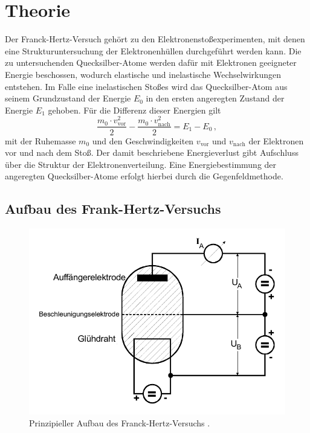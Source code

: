 \section{Theorie}
\label{sec:Theorie}

Der Franck-Hertz-Versuch gehört zu den Elektronenstoßexperimenten, 
mit denen eine Strukturuntersuchung der Elektronenhüllen durchgeführt werden kann.
Die zu untersuchenden Quecksilber-Atome werden dafür mit Elektronen geeigneter Energie beschossen, 
wodurch elastische und inelastische Wechselwirkungen entstehen.
Im Falle eine inelastischen Stoßes wird das Quecksilber-Atom aus seinem Grundzustand der Energie $E_0$
in den ersten angeregten Zustand der Energie $E_1$ gehoben.
Für die Differenz dieser Energien gilt
\begin{equation}
    \frac{m_{0} \cdot v_{\text{vor}}^{2}}{2}-\frac{m_{0} \cdot v_{\text{nach}}^{2}}{2}=E_{1}-E_{0} \, ,
\end{equation}
mit der Ruhemasse $m_0$ und den Geschwindigkeiten $v_{\text{vor}}$ und $v_{\text{nach}}$ der Elektronen vor und nach dem Stoß.
Der damit beschriebene Energieverlust gibt Aufschluss über die Struktur der Elektronenverteilung.
Eine Energiebestimmung der angeregten Quecksilber-Atome erfolgt hierbei durch die Gegenfeldmethode.


\subsection{Aufbau des Frank-Hertz-Versuchs}\label{subsec:aufbau}

\begin{figure}
    \centering
    \includegraphics[width=0.6\linewidth]{pictures/aufbau.pdf}
    \caption{Prinzipieller Aufbau des Franck-Hertz-Versuchs \cite{v601}.}
    \label{fig:aufbau}
\end{figure}

